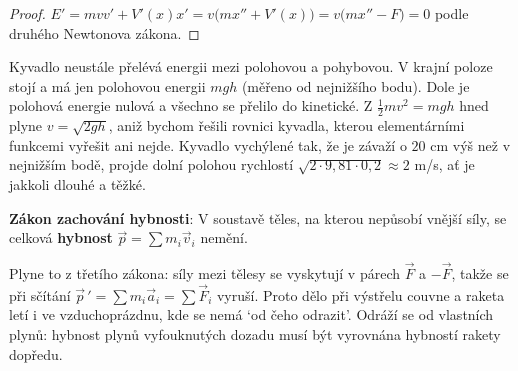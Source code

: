 \begin{proof}
  $E' = mvv' + V'(x)x' = v\big(mx'' + V'(x)\big) = v\big(mx'' - F\big) = 0$ podle druhého Newtonova zákona.
\end{proof}

\begin{center}
\end{center}

Kyvadlo neustále přelévá energii mezi polohovou a pohybovou. V krajní poloze stojí a má jen polohovou energii $mgh$ (měřeno od nejnižšího bodu). Dole je polohová energie nulová a všechno se přelilo do kinetické. Z $\frac{1}{2}mv^2 = mgh$ hned plyne $v = \sqrt{2gh}$, aniž bychom řešili rovnici kyvadla, kterou elementárními funkcemi vyřešit ani nejde. Kyvadlo vychýlené tak, že je závaží o $20$ cm výš než v nejnižším bodě, projde dolní polohou rychlostí $\sqrt{2\cdot 9{,}81\cdot 0{,}2}\approx 2$ m/s, ať je jakkoli dlouhé a těžké.

\begin{definitionbox}
  \textbf{Zákon zachování hybnosti}: V soustavě těles, na kterou nepůsobí vnější síly, se celková \textbf{hybnost} $\vec{p} = \sum m_i\vec{v}_i$ nemění.
\end{definitionbox}

Plyne to z třetího zákona: síly mezi tělesy se vyskytují v párech $\vec{F}$ a $-\vec{F}$, takže se při sčítání $\vec{p}\,' = \sum m_i\vec{a}_i = \sum\vec{F}_i$ vyruší. Proto dělo při výstřelu couvne a raketa letí i ve vzduchoprázdnu, kde se nemá `od čeho odrazit'. Odráží se od vlastních plynů: hybnost plynů vyfouknutých dozadu musí být vyrovnána hybností rakety dopředu.

